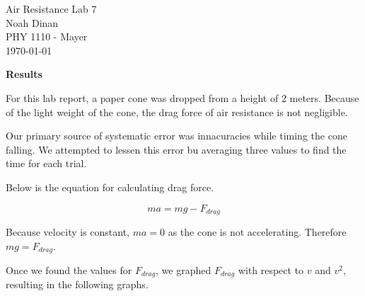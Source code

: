 \documentclass[12pt]{article}
\begin{document}
\begin{center}
\vspace*{\fill}
Air Resistance Lab 7 \\ Noah Dinan \\ PHY 1110 - Mayer \\ \today \\
\vspace*{\fill}
\end{center}

\newpage
{} %

\setlength{\parindent}{0in}

\textbf{Results}

For this lab report, a paper cone was dropped from a height of 2 meters.
Because of the light weight of the cone, the drag force of air resistance is not negligible.

Our primary source of systematic error was innacuracies while timing the cone falling.
We attempted to lessen this error bu averaging three values to find the time for each trial.

Below is the equation for calculating drag force.

\[ma = mg - F_{drag} \]

Because velocity is constant, $ ma = 0 $ as the cone is not accelerating. Therefore $ mg = F_{drag} $.

Once we found the values for $ F_{drag} $, we graphed $ F_{drag} $ with respect to $v$ and $v^2$, resulting in the following
graphs.

\newpage
\end{document}
